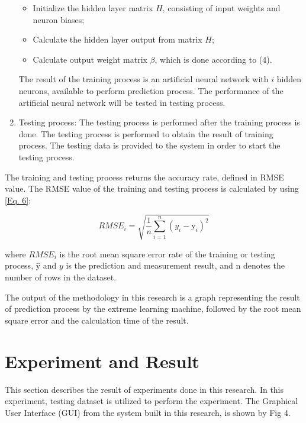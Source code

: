 \documentclass[journal,comsoc]{IEEEtran}
\begin{document}
\begin{enumerate}
\begin{itemize}
\item Initialize the hidden layer matrix $H$, consisting of input weights and neuron biases;
\item Calculate the hidden layer output from matrix $H$;
\item Calculate output weight matrix $\beta$, which is done according to (4).
\end{itemize}

The result of the training process is an artificial neural network with $i$ hidden neurons, available to perform prediction process. The performance of the artificial neural network will be tested in testing process.

\item Testing process: The testing process is performed after the training process is done. The testing process is performed to obtain the result of training process. The testing data is provided to the system in order to start the testing process.

\end{enumerate}

The training and testing process returns the accuracy rate, defined in RMSE value. The RMSE value of the training and testing process is calculated by using \eqref{Eq. 6}:

\begin{equation}
RMSE_{i} = \sqrt{\frac{1}{n} \sum_{i=1}^{n} (y_i - \hat{\mathrm{y}}_i)^{2}}
	\label{Eq. 6}
\end{equation}

where $RMSE_{i}$ is the root mean square error rate of the training or testing process, $\hat{\mathrm{y}}$  and $y$ is the prediction and measurement result, and n denotes the number of rows in the dataset.

The output of the methodology in this research is a graph representing the result of prediction process by the extreme learning machine, followed by the root mean square error and the calculation time of the result.

\section{Experiment and Result}

This section describes the result of experiments done in this research. In this experiment, testing dataset is utilized to perform the experiment. The Graphical User Interface (GUI) from the system built in this research, is shown by Fig 4.
\end{document}
